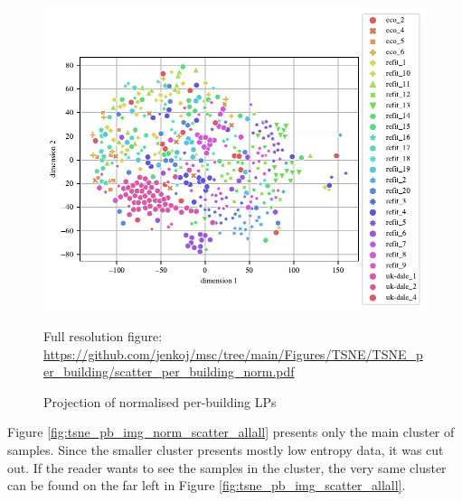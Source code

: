 \begin{figure}[H]
	\centering
	\caption{Projection of normalised per-building LPs}
	\includegraphics[]{Figures/TSNE/TSNE_per_building/scatter_per_building_norm.pdf}
	\label{fig:tsne_pb_scatter_all_all}
	\par
	\par\footnotesize{Full resolution figure: \url{https://github.com/jenkoj/msc/tree/main/Figures/TSNE/TSNE_per_building/scatter_per_building_norm.pdf}}
\end{figure}

Figure \ref{fig:tsne_pb_img_norm_scatter_allall} presents only the main cluster of samples.
Since the smaller cluster presents mostly low entropy data, it was cut out. 
If the reader wants to see the samples in the cluster, the very same cluster can be found on the far left in Figure \ref{fig:tsne_pb_img_scatter_allall}.

